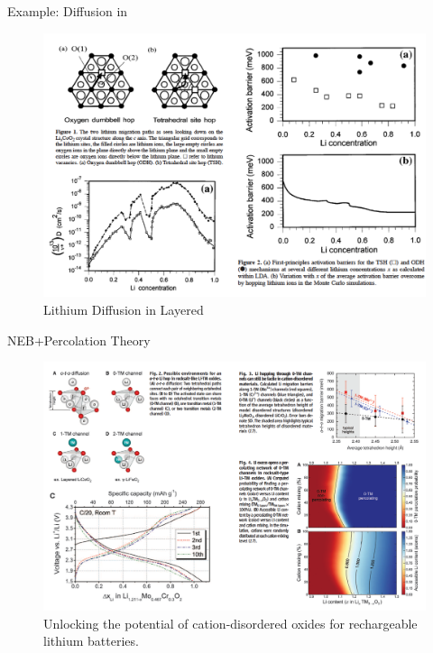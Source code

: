 \documentclass[aspectratio=169]{beamer}
\begin{document}
    \begin{frame}{Example: Diffusion in }
        \begin{figure}
            \centering
            \includegraphics[width=0.6\linewidth]{lectures/figures/12-LCO_Diffusion.png}
            \caption{Lithium Diffusion in Layered \cite{vandervenLithiumDiffusionLayered2000}}
        \end{figure}
    \end{frame}


    \begin{frame}{NEB+Percolation Theory}
        \begin{figure}
            \centering
            \includegraphics[width=0.6\linewidth]{lectures/figures/12-Percolation.png}
            \caption{Unlocking the potential of cation-disordered oxides for rechargeable lithium batteries.\cite{leeUnlockingPotentialCationdisordered2014}}
        \end{figure}
    \end{frame}
\end{document}
